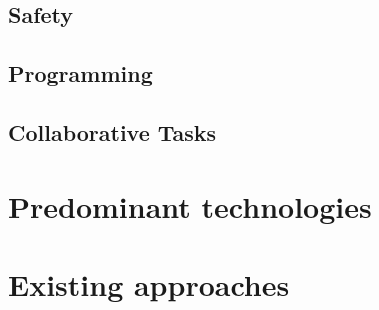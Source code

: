 
\subsection{Safety}


\subsection{Programming}



\subsection{Collaborative Tasks}





\section{Predominant technologies}


\section{Existing approaches}

